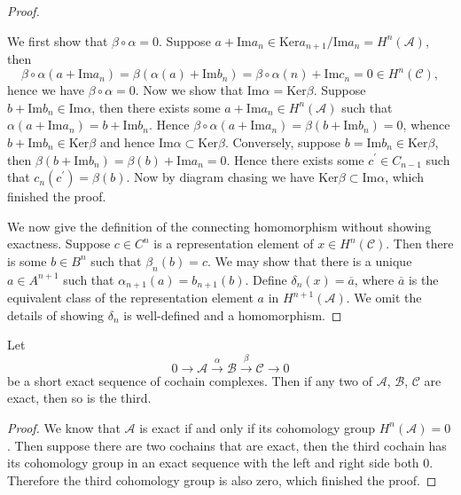 \begin{proof}
\begin{center}
\begin{tikzpicture}[x=0.75pt,y=0.75pt,yscale=-1,xscale=1]
\end{tikzpicture}
\end{center}
We first show that $\beta\circ\alpha=0$. Suppose $a+\mathrm{Im}a_n\in\mathrm{Ker}a_{n+1}/\mathrm{Im}a_n=H^n(\mathcal{A})$, then 
$$
\beta \circ \alpha \left( a+\mathrm{Im}a_n \right) =\beta \left( \alpha \left( a \right) +\mathrm{Im}b_n \right) =\beta \circ \alpha \left( n \right) +\mathrm{Im}c_n=0\in H^n\left( \mathcal{C} \right) ,
$$
hence we have $\beta\circ\alpha=0$. Now we show that $\mathrm{Im}\alpha=\mathrm{Ker}\beta$. Suppose $b+\mathrm{Im}b_n\in\mathrm{Im}\alpha$, then there exists some $a+\mathrm{Im}a_n\in H^n(\mathcal{A})$ such that $\alpha(a+\mathrm{Im}a_n)=b+\mathrm{Im}b_n$. Hence $\beta\circ\alpha(a+\mathrm{Im}a_n)=\beta(b+\mathrm{Im}b_n)=0$, whence $b+\mathrm{Im}b_n\in\mathrm{Ker}\beta$ and hence $\mathrm{Im}\alpha\subset\mathrm{Ker}\beta$. Conversely, suppose $b=\mathrm{Im}b_n\in\mathrm{Ker}\beta$, then $\beta(b+\mathrm{Im}b_n)=\beta(b)+\mathrm{Im}a_n=0$. Hence there exists some $c^\prime\in C_{n-1}$ such that $c_n(c^\prime)=\beta(b)$. Now by diagram chasing we have $\mathrm{Ker}\beta\subset\mathrm{Im}\alpha$, which finished the proof.\par
We now give the definition of the connecting homomorphism without showing exactness. Suppose $c\in C^n$ is a representation element of $x\in H^n(\mathcal{C})$. Then there is some $b\in B^n$ such that $\beta_n(b)=c$. We may show that there is a unique $a\in A^{n+1}$ such that $\alpha_{n+1}(a)=b_{n+1}(b)$. Define $\delta_n(x)=\overline{a}$, where $\overline{a}$ is the equivalent class of the representation element $a$ in $H^{n+1}(\mathcal{A})$. We omit the details of showing $\delta_n$ is well-defined and a homomorphism.
\end{proof}
\begin{corollary}
Let 
$$
0\longrightarrow \mathcal{A} \overset{\alpha}{\longrightarrow}\mathcal{B} \overset{\beta}{\longrightarrow}\mathcal{C} \longrightarrow 0
$$
be a short exact sequence of cochain complexes. Then if any two of $\mathcal{A}$, $\mathcal{B}$, $\mathcal{C}$ are exact, then so is the third.
\end{corollary}
\begin{proof}
We know that $\mathcal{A}$ is exact if and only if its cohomology group $H^n(\mathcal{A})=0$. Then suppose there are two cochains that are exact, then the third cochain has its cohomology group in an exact sequence with the left and right side both $0$. Therefore the third cohomology group is also zero, which finished the proof.
\end{proof}
